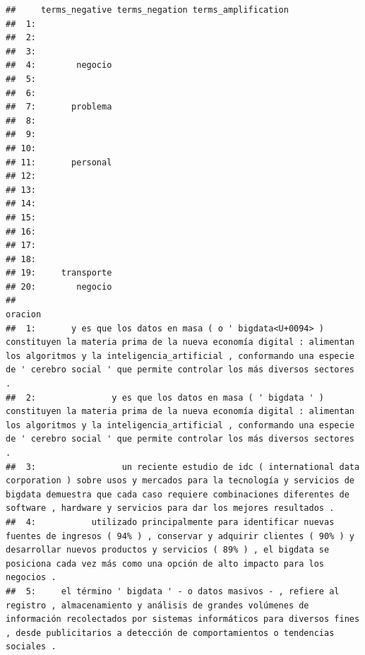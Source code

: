 \documentclass[
]{book}
\begin{document}
\begin{verbatim}
##     terms_negative terms_negation terms_amplification
##  1:                                                  
##  2:                                                  
##  3:                                                  
##  4:        negocio                                   
##  5:                                                  
##  6:                                                  
##  7:       problema                                   
##  8:                                                  
##  9:                                                  
## 10:                                                  
## 11:       personal                                   
## 12:                                                  
## 13:                                                  
## 14:                                                  
## 15:                                                  
## 16:                                                  
## 17:                                                  
## 18:                                                  
## 19:     transporte                                   
## 20:        negocio                                   
##                                                                                                                                                                                                                                                                          oracion
##  1:       y es que los datos en masa ( o ' bigdata<U+0094> ) constituyen la materia prima de la nueva economía digital : alimentan los algoritmos y la inteligencia_artificial , conformando una especie de ' cerebro social ' que permite controlar los más diversos sectores .
##  2:               y es que los datos en masa ( ' bigdata ' ) constituyen la materia prima de la nueva economía digital : alimentan los algoritmos y la inteligencia_artificial , conformando una especie de ' cerebro social ' que permite controlar los más diversos sectores .
##  3:                 un reciente estudio de idc ( international data corporation ) sobre usos y mercados para la tecnología y servicios de bigdata demuestra que cada caso requiere combinaciones diferentes de software , hardware y servicios para dar los mejores resultados .
##  4:           utilizado principalmente para identificar nuevas fuentes de ingresos ( 94% ) , conservar y adquirir clientes ( 90% ) y desarrollar nuevos productos y servicios ( 89% ) , el bigdata se posiciona cada vez más como una opción de alto impacto para los negocios .
##  5:     el término ' bigdata ' - o datos masivos - , refiere al registro , almacenamiento y análisis de grandes volúmenes de información recolectados por sistemas informáticos para diversos fines , desde publicitarios a detección de comportamientos o tendencias sociales .

\end{verbatim}
\end{document}

